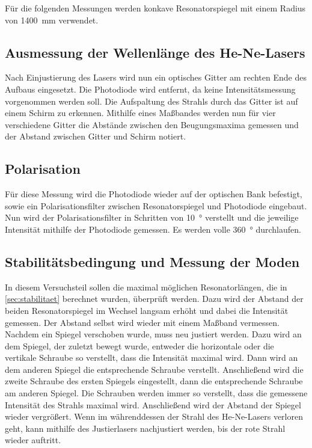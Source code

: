     Für die folgenden Messungen werden konkave Resonatorspiegel mit einem Radius von \SI{1400}{\milli\meter} verwendet.


\subsection{Ausmessung der Wellenlänge des He-Ne-Lasers}

    Nach Einjustierung des Lasers wird nun ein optisches Gitter am rechten Ende des Aufbaus eingesetzt.
    Die Photodiode wird entfernt, da keine Intensitätsmessung vorgenommen werden soll.
    Die Aufspaltung des Strahls durch das Gitter ist auf einem Schirm zu erkennen.
    Mithilfe eines Maßbandes werden nun für vier verschiedene Gitter die Abstände zwischen den Beugungsmaxima gemessen
    und der Abstand zwischen Gitter und Schirm notiert.


\subsection{Polarisation}

    Für diese Messung wird die Photodiode wieder auf der optischen Bank befestigt,
    sowie ein Polarisationsfilter zwischen Resonatorspiegel und Photodiode eingebaut.
    Nun wird der Polarisationsfilter in Schritten von \SI{10}{\degree} verstellt und die jeweilige Intensität mithilfe der Photodiode gemessen.
    Es werden volle \SI{360}{\degree} durchlaufen.


\subsection{Stabilitätsbedingung und Messung der Moden}

    In diesem Versuchsteil sollen die maximal möglichen Resonatorlängen,
    die in \autoref{sec:stabilitaet} berechnet wurden,
    überprüft werden.
    Dazu wird der Abstand der beiden Resonatorspiegel im Wechsel langsam erhöht und dabei die Intensität gemessen.
    Der Abstand selbst wird wieder mit einem Maßband vermessen.
    Nachdem ein Spiegel verschoben wurde,
    muss neu justiert werden.
    Dazu wird an dem Spiegel,
    der zuletzt bewegt wurde,
    entweder die horizontale oder die vertikale Schraube so verstellt,
    dass die Intensität maximal wird.
    Dann wird an dem anderen Spiegel die entsprechende Schraube verstellt.
    Anschließend wird die zweite Schraube des ersten Spiegels eingestellt,
    dann die entsprechende Schraube am anderen Spiegel.
    Die Schrauben werden immer so verstellt,
    dass die gemessene Intensität des Strahls maximal wird.
    Anschließend wird der Abstand der Spiegel wieder vergrößert.
    Wenn im währenddessen der Strahl des He-Ne-Lasers verloren geht,
    kann mithilfe des Justierlasers nachjustiert werden,
    bis der rote Strahl wieder auftritt.

